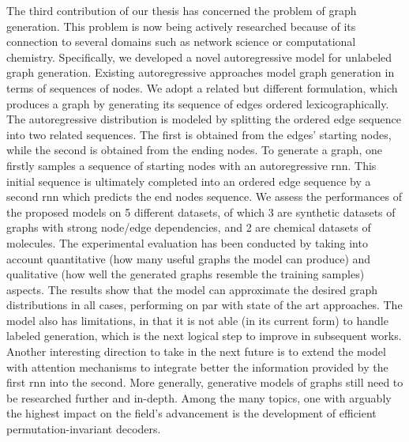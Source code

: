 The third contribution of our thesis has concerned the problem of graph generation. This problem is now being actively researched because of its connection to several domains such as network science or computational chemistry. Specifically, we developed a novel autoregressive model for unlabeled graph generation. Existing autoregressive approaches model graph generation in terms of sequences of nodes. We adopt a related but different formulation, which produces a graph by generating its sequence of edges ordered lexicographically. The autoregressive distribution is modeled by splitting the ordered edge sequence into two related sequences. The first is obtained from the edges' starting nodes, while the second is obtained from the ending nodes. To generate a graph, one firstly samples a sequence of starting nodes with an autoregressive \gls{rnn}. This initial sequence is ultimately completed into an ordered edge sequence by a second \gls{rnn} which predicts the end nodes sequence. We assess the performances of the proposed models on 5 different datasets, of which 3 are synthetic datasets of graphs with strong node/edge dependencies, and 2 are chemical datasets of molecules. The experimental evaluation has been conducted by taking into account quantitative (\ie how many useful graphs the model can produce) and qualitative (\ie how well the generated graphs resemble the training samples) aspects. The results show that the model can approximate the desired graph distributions in all cases, performing on par with state of the art approaches. The model also has limitations, in that it is not able (in its current form) to handle labeled generation, which is the next logical step to improve in subsequent works. Another interesting direction to take in the next future is to extend the model with attention mechanisms to integrate better the information provided by the first \gls{rnn} into the second. More generally, generative models of graphs still need to be researched further and in-depth. Among the many topics, one with arguably the highest impact on the field's advancement is the development of efficient permutation-invariant decoders.
\vspace{1em}


